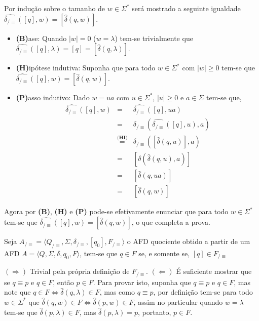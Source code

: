\begin{prova}
	Por indução sobre o tamanho de $w \in \Sigma^*$ será mostrado a seguinte igualdade $\widehat{\delta_{/\equiv}}([q], w) = [\widehat{\delta}(q, w)]$.
	\begin{itemize}
		\item[ ] \textbf{(B)}ase: Quando $|w| = 0$ ($w = \lambda$) tem-se trivialmente que $\widehat{\delta_{/\equiv}}([q], \lambda) = [q] = [\widehat{\delta}(q, \lambda)]$.
		
		\item[ ] \textbf{(H)}ipótese indutiva: Suponha que para todo $w \in \Sigma^*$ com $|w| \geq 0$ tem-se que $\widehat{\delta_{/\equiv}}([q], w) = [\widehat{\delta}(q, w)]$.
		\item[ ] \textbf{(P)}asso indutivo: Dado $w = ua$ com $u \in \Sigma^*$, $|u| \geq 0$ e $a \in \Sigma$ tem-se que, 
		\begin{eqnarray*}
			\widehat{\delta_{/\equiv}}([q], w) & = & \widehat{\delta_{/\equiv}}([q], ua)\\
			& = & \delta_{/\equiv}(\widehat{\delta_{/\equiv}}([q], u),a)\\
			& \stackrel{\textbf{(HI)}}{=} & \delta_{/\equiv}([\widehat{\delta}(q, u)],a)\\
			& = & [\delta(\widehat{\delta}(q, u),a)]\\
			& = & [\widehat{\delta}(q, ua)]\\
			& = & [\widehat{\delta}(q, w)]
		\end{eqnarray*}
	\end{itemize}
	Agora por  \textbf{(B)}, \textbf{(H)} e \textbf{(P)} pode-se efetivamente enunciar  que para todo $w \in \Sigma^*$ tem-se que $\widehat{\delta_{/\equiv}}([q], w) = [\widehat{\delta}(q, w)]$, o que completa a prova.
\end{prova}

\begin{teorema}\label{teo:FinalQuociente}
	Seja  $A_{/\equiv} = \langle Q_{/\equiv}, \Sigma, \delta_{/\equiv}, [q_0],  F_{/\equiv}\rangle$ o AFD quociente obtido a partir de um AFD $A = \langle Q, \Sigma, \delta, q_0, F\rangle$, tem-se que $q \in F$ se, e somente se, $[q] \in F_{/\equiv}$
\end{teorema}

\begin{prova}
	$(\Rightarrow)$ Trivial pela própria definição de $ F_{/\equiv}$. $(\Leftarrow)$ É suficiente mostrar que se $q \equiv p$ e $q \in F$, então $p \in F$. Para provar isto, suponha que $q \equiv p$ e $q \in F$, mas note que $q \in F \Longleftrightarrow \widehat{\delta}(q, \lambda) \in F$, mas como $q \equiv p$, por definição tem-se para todo $w \in \Sigma^*$ que $\widehat{\delta}(q, w) \in F \Longleftrightarrow \widehat{\delta}(p, w) \in F$, assim no particular quando $w = \lambda$ tem-se que  $\widehat{\delta}(p, \lambda) \in F$, mas $\widehat{\delta}(p, \lambda) = p$, portanto, $p \in F$.
\end{prova}

